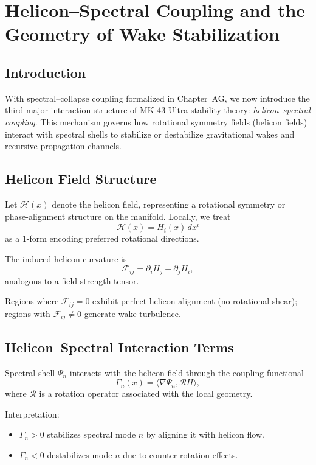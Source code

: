 
\chapter{Helicon–Spectral Coupling and the Geometry of Wake Stabilization}

\section{Introduction}
With spectral–collapse coupling formalized in Chapter~AG, we now introduce the third major interaction structure of MK-43 Ultra stability theory: \emph{helicon–spectral coupling}. This mechanism governs how rotational symmetry fields (helicon fields) interact with spectral shells to stabilize or destabilize gravitational wakes and recursive propagation channels.

\section{Helicon Field Structure}
Let $\mathcal{H}(x)$ denote the helicon field, representing a rotational symmetry or phase-alignment structure on the manifold. Locally, we treat
\[
\mathcal{H}(x) = H_i(x)\, dx^i
\]
as a 1-form encoding preferred rotational directions.

The induced helicon curvature is
\[
\mathcal{F}_{ij} = \partial_i H_j - \partial_j H_i,
\]
analogous to a field-strength tensor.

Regions where $\mathcal{F}_{ij} = 0$ exhibit perfect helicon alignment (no rotational shear); regions with $\mathcal{F}_{ij} \neq 0$ generate wake turbulence.

\section{Helicon–Spectral Interaction Terms}
Spectral shell $\Psi_n$ interacts with the helicon field through the coupling functional
\[
\Gamma_n(x) = \langle \nabla \Psi_n, \mathcal{R} H \rangle,
\]
where $\mathcal{R}$ is a rotation operator associated with the local geometry.

Interpretation:
\begin{itemize}
  \item $\Gamma_n > 0$ stabilizes spectral mode $n$ by aligning it with helicon flow.
  \item $\Gamma_n < 0$ destabilizes mode $n$ due to counter-rotation effects.
\end{itemize}

